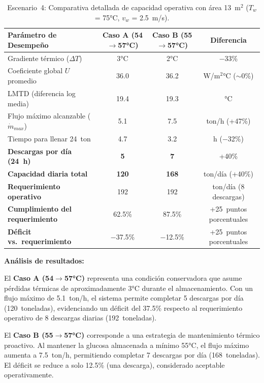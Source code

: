 \begin{table}[H]
\centering
\caption{Escenario~4: Comparativa detallada de capacidad operativa con área 13~m$^2$ ($T_w$ = 75°C, $v_w$ = 2.5~m/s).}
\label{tab:resumen_esc4_capacidad}
\setcounter{itemcount}{0}
\begin{tabularx}{\textwidth}{@{}Xccc@{}}
\toprule
\textbf{Parámetro de Desempeño} & \textbf{Caso A (54$\rightarrow$57°C)} & \textbf{Caso B (55$\rightarrow$57°C)} & \textbf{Diferencia} \\
\midrule
Gradiente térmico ($\Delta T$) & 3°C & 2°C & $-$33\% \\
Coeficiente global $U$ promedio & 36.0 & 36.2 & W/m$^2$°C ($\sim$0\%) \\
LMTD (diferencia log media) & 19.4 & 19.3 & °C \\
Flujo máximo alcanzable ($\dot{m}_{max}$) & 5.1 & 7.5 & ton/h (+47\%) \\
Tiempo para llenar 24~ton & 4.7 & 3.2 & h ($-$32\%) \\
\midrule
\textbf{Descargas por día (24~h)} & \textbf{5} & \textbf{7} & +40\% \\
\textbf{Capacidad diaria total} & \textbf{120} & \textbf{168} & ton/día (+40\%) \\
\textbf{Requerimiento operativo} & 192 & 192 & ton/día (8 descargas) \\
\textbf{Cumplimiento del requerimiento} & 62.5\% & 87.5\% & +25~puntos porcentuales \\
\textbf{Déficit vs.~requerimiento} & $-$37.5\% & $-$12.5\% & +25~puntos porcentuales \\
\bottomrule
\end{tabularx}
\end{table}

\textbf{Análisis de resultados:}

El \textbf{Caso A (54$\rightarrow$57°C)} representa una condición conservadora que asume pérdidas térmicas de aproximadamente 3°C durante el almacenamiento. Con un flujo máximo de 5.1~ton/h, el sistema permite completar 5 descargas por día (120~toneladas), evidenciando un déficit del 37.5\% respecto al requerimiento operativo de 8 descargas diarias (192~toneladas).

El \textbf{Caso B (55$\rightarrow$57°C)} corresponde a una estrategia de mantenimiento térmico proactivo. Al mantener la glucosa almacenada a mínimo 55°C, el flujo máximo aumenta a 7.5~ton/h, permitiendo completar 7 descargas por día (168~toneladas). El déficit se reduce a solo 12.5\% (una descarga), considerado aceptable operativamente.


